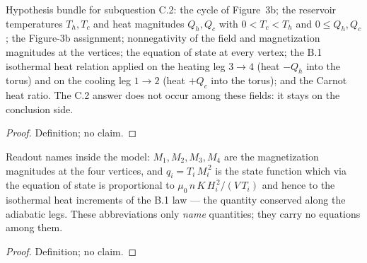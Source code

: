 \begin{definition}
\label{def:IPhO2026Problems_problem_IPhO_2026_3_C_2:CarnotMagnetizationModel}
Hypothesis bundle for subquestion C.2: the cycle of Figure~3b; the
reservoir temperatures $T_h, T_c$ and heat magnitudes $Q_h, Q_c$ with
$0 < T_c < T_h$ and $0 \le Q_h, Q_c$; the Figure-3b assignment;
nonnegativity of the field and magnetization magnitudes at the
vertices; the equation of state at every vertex; the B.1 isothermal
heat relation applied on the heating leg $3 \to 4$ (heat $-Q_h$ into
the torus) and on the cooling leg $1 \to 2$ (heat $+Q_c$ into the
torus); and the Carnot heat ratio. The C.2 answer does not occur
among these fields: it stays on the conclusion side.
\end{definition}
\begin{proof}
Definition; no claim.
\end{proof}

\begin{definition}
\label{def:IPhO2026Problems_problem_IPhO_2026_3_C_2:q}
Readout names inside the model: $M_1, M_2, M_3, M_4$ are the
magnetization magnitudes at the four vertices, and
$q_i = T_i\,M_i^{\,2}$ is the state function which via the equation of
state is proportional to $\mu_0\,n\,K\,H_i^{\,2}/(V\,T_i)$ and hence
to the isothermal heat increments of the B.1 law --- the quantity
conserved along the adiabatic legs. These abbreviations only
\emph{name} quantities; they carry no equations among them.
\end{definition}
\begin{proof}
Definition; no claim.
\end{proof}

